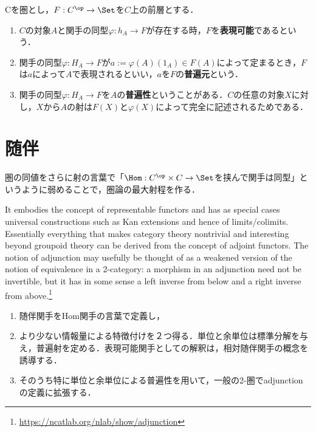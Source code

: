 \documentclass[uplatex,dvipdfmx]{jsreport}
\begin{document}
\begin{definition}
    Cを圏とし，$F:C^\op\to\Set$を$C$上の前層とする．
    \begin{enumerate}
        \item $C$の対象$A$と関手の同型$\varphi:h_A\to F$が存在する時，$F$を\textbf{表現可能}であるという．
        \item 関手の同型$\varphi:H_A\to F$が$a:=\varphi(A)(1_A)\in F(A)$によって定まるとき，$F$は$a$によって$A$で表現されるといい，$a$を$F$の\textbf{普遍元}という．
        \item 関手の同型$\varphi:H_A\to F$を$A$の\textbf{普遍性}ということがある．$C$の任意の対象$X$に対し，$X$から$A$の射は$F(X)$と$\varphi(X)$によって完全に記述されるためである．
    \end{enumerate}
\end{definition}

\chapter{随伴}

\begin{tcolorbox}[colframe=ForestGreen, colback=ForestGreen!10!white, breakable ,colbacktitle=ForestGreen!40!white, coltitle=black,fonttitle=\bfseries\sffamily,
    title=]
    圏の同値をさらに射の言葉で「$\Hom:C^\op\times C\to\Set$を挟んで関手は同型」というように弱めることで，圏論の最大射程を作る．
    
    It embodies the concept of representable functors and has as special cases universal constructions such as Kan extensions and hence of limits/colimits.
    Essentially everything that makes category theory nontrivial and interesting beyond groupoid theory can be derived from the concept of adjoint functors.
    The notion of adjunction may usefully be thought of as a weakened version of the notion of equivalence in a 2-category: a morphism in an adjunction need not be invertible, but it has in some sense a left inverse from below and a right inverse from above.\footnote{\url{https://ncatlab.org/nlab/show/adjunction}}
    \begin{enumerate}
        \item 随伴関手をHom関手の言葉で定義し，
        \item より少ない情報量による特徴付けを２つ得る．単位と余単位は標準分解を与え，普遍射を定める．表現可能関手としての解釈は，相対随伴関手の概念を誘導する．
        \item そのうち特に単位と余単位による普遍性を用いて，一般の2-圏でadjunctionの定義に拡張する．
    \end{enumerate}
\end{tcolorbox}
\end{document}
